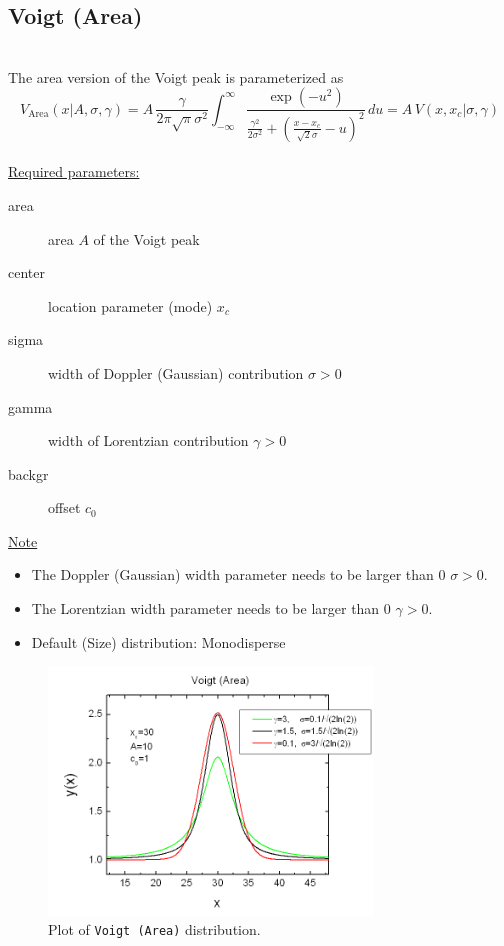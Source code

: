 \clearpage

\subsection{Voigt (Area)} ~\\[5mm]
\label{sec:VoigtArea}
The area version of the Voigt peak is parameterized as
\begin{equation}
V_\text{Area}(x\vert A,\sigma,\gamma)
= A \, \frac{\gamma}{2\pi\sqrt{\pi}\sigma^2} \int_{-\infty}^\infty \frac{\exp(-u^2)}{\frac{\gamma^2}{2\sigma^2}+\left( \frac{x-x_c}{\sqrt{2}\sigma}-u\right)^2} \, du
= A \, V(x,x_c\vert\sigma,\gamma)
\end{equation}
~\\

\underline{Required parameters:}
\begin{description}
    \item[area] area $A$ of the Voigt peak
    \item[center] location parameter (mode) $x_c$
    \item[sigma] width of Doppler (Gaussian) contribution $\sigma>0$
    \item[gamma] width of Lorentzian contribution $\gamma>0$
    \item[backgr] offset $c_0$
\end{description}

\underline{Note}
\begin{itemize}
  \item The Doppler (Gaussian) width parameter needs to be larger than 0 $\sigma>0$.
  \item The Lorentzian width parameter needs to be larger than 0 $\gamma>0$.
  \item Default (Size) distribution: Monodisperse
\end{itemize}


\begin{figure}[htb]
\begin{center}
\includegraphics[width=0.768\textwidth]{VoigtArea.png}
\end{center}
\caption{Plot of \texttt{Voigt (Area)} distribution.}
\label{fig:VoigtArea}
\end{figure}


